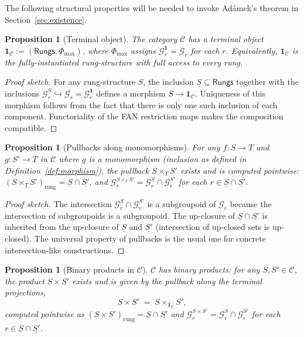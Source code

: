 \documentclass[11pt, a4paper]{amsart}
\newtheorem{proposition}[theorem]{Proposition}
\theoremstyle{definition}
\newcommand{\Rungs}{\mathsf{Rungs}}
\newcommand{\catC}{\mathcal{C}}
\newcommand{\Gcal}{\mathcal{G}}
\begin{document}
The following structural properties will be needed to invoke
Ad\'amek's theorem in Section~\ref{sec:existence}.

\begin{proposition}[Terminal object]
\label{prop:terminal}
The category $\catC$ has a terminal object $\mathbf{1}_\catC :=
(\Rungs, \Phi_{\max})$, where $\Phi_{\max}$ assigns $\Gcal_r^{\mathbf 1} =
\Gcal_r$ for each $r$. Equivalently, $\mathbf{1}_\catC$ is the
fully-instantiated rung-structure with full access to every rung.
\end{proposition}

\begin{proof}[Proof sketch]
For any rung-structure $S$, the inclusion $\underline{S}
\subseteq \Rungs$ together with the inclusions $\Gcal_r^S
\hookrightarrow \Gcal_r = \Gcal_r^{\mathbf{1}}$ defines a
morphism $S \to \mathbf{1}_\catC$. Uniqueness of this morphism
follows from the fact that there is only one such inclusion of
each component. Functoriality of the FAN restriction maps makes
the composition compatible.
\end{proof}

\begin{proposition}[Pullbacks along monomorphisms]
\label{prop:pullbacks}
For any $f \colon S \to T$ and $g \colon S' \to T$ in $\catC$
where $g$ is a monomorphism (inclusion as defined in
Definition~\ref{def:morphism}), the pullback $S \times_T S'$
exists and is computed pointwise: $(S \times_T S')_{\mathrm{rung}} =
\underline{S} \cap \underline{S'}$, and
$\Gcal_r^{S \times_T S'} = \Gcal_r^S \cap \Gcal_r^{S'}$ for
each $r \in \underline{S} \cap \underline{S'}$.
\end{proposition}

\begin{proof}[Proof sketch]
The intersection $\Gcal_r^S \cap \Gcal_r^{S'}$ is a subgroupoid
of $\Gcal_r$ because the intersection of subgroupoids is a
subgroupoid. The up-closure of $\underline{S} \cap
\underline{S'}$ is inherited from the up-closure of
$\underline{S}$ and $\underline{S'}$ (intersection of
up-closed sets is up-closed). The universal property of
pullbacks is the usual one for concrete intersection-like
constructions.
\end{proof}

\begin{proposition}[Binary products in $\catC$]
\label{prop:products}
$\catC$ has binary products: for any $S, S' \in \catC$, the
product $S \times S'$ exists and is given by the pullback along
the terminal projections,
\[
    S \times S' \;=\; S \times_{\mathbf{1}_\catC} S',
\]
computed pointwise as
$(S \times S')_{\mathrm{rung}} = \underline{S} \cap
\underline{S'}$ and $\Gcal_r^{S \times S'} = \Gcal_r^S \cap
\Gcal_r^{S'}$ for each $r \in \underline{S} \cap
\underline{S'}$.
\end{proposition}
\end{document}
